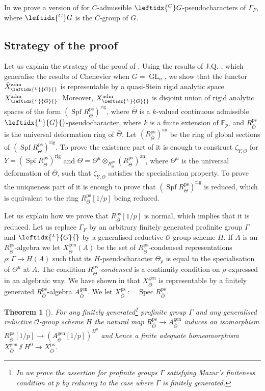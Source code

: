 \documentclass{amsart}
\newtheorem{thm}[prop]{Theorem}
\theoremstyle{definition}
\theoremstyle{remark}
\DeclareMathOperator{\GL}{GL}
\DeclareMathOperator{\Spec}{Spec}
\newcommand{\Fp}{\mathbb F_p}
\newcommand{\OO}{\mathcal O}
\newcommand{\ana}{\mathrm{an}}
\newcommand{\adm}{\mathrm{adm}}
\newcommand{\gen}{\mathrm{gen}}
\DeclareMathOperator{\Spf}{Spf}
\newcommand{\rig}{\mathrm{rig}}
\newcommand{\Thetabar}{\overline{\Theta}}
\newcommand{\ps}{\mathrm{ps}}
\newcommand{\LG}{\leftidx{^L}{G}{}}
\newcommand{\CG}{\leftidx{^C}G{}}
\begin{document}
In  we prove a version of  for $C$-admissible $\CG$-pseudo\-characters of $\Gamma_F$, where
$\CG$ is the $C$-group of $G$. 


\subsection{Strategy of the proof}
Let us explain the strategy of the proof of . Using the results of J.Q. \cite{quast}, which generalise the results of 
Chenevier \cite{che_durham} when $G=\GL_n$, we show that the functor $\tilde{X}^{\adm}_{\LG}$ is representable by 
a quasi-Stein rigid analytic space $X^{\adm}_{\LG}$. 
Moreover, $X^{\adm}_{\LG}$ is 
disjoint union of rigid analytic spaces of 
the form $(\Spf R^{\ps}_{\Thetabar})^{\rig}$, 
where $\Thetabar$ is a $k$-valued continuous 
admissible $\LG$-pseudocharacter, where $k$ is a 
finite extension of $\Fp$, and $R^{\ps}_{\Thetabar}$
is the universal deformation ring of $\Thetabar$. 
Let $(R^{\ps}_{\Thetabar})^{\ana}$ be the ring of 
global sections of $(\Spf R^{\ps}_{\Thetabar})^{\rig}$. To prove the existence part of  it is enough to construct $\zeta_{Y, \Theta}$ for $Y= (\Spf R^{\ps}_{\Thetabar})^{\rig}$ and $\Theta=\Theta^{u}\otimes _{R^{\ps}_{\Thetabar}} (R^{\ps}_{\Thetabar})^{\ana}$, where $\Theta^{u}$  is the universal deformation
of $\Thetabar$, such that $\zeta_{Y, \Theta}$ satisfies the specialisation property. To prove the uniqueness part of  it is 
enough to prove that $(\Spf R^{\ps}_{\Thetabar})^{\rig}$ is reduced, which is equivalent to the ring $R^{\ps}_{\Thetabar}[1/p]$ being reduced. 

Let us explain how we prove that $R^{\ps}_{\Thetabar}[1/p]$ is normal, which implies that it is reduced.  Let us replace 
$\Gamma_F$ by an arbitrary finitely generated profinite group $\Gamma$ and $\LG$ by a generalised reductive $\OO$-group scheme $H$. If $A$ is an $R^{\ps}_{\Thetabar}$-algebra we let $X^{\gen}_{\Thetabar}(A)$ be the 
set of $R^{\ps}_{\Thetabar}$-condensed representations $\rho: \Gamma \rightarrow H(A)$ such that its $H$-pseudocharacter $\Theta_{\rho}$ is equal to the specialisation of $\Theta^u$ at $A$. 
The condition \textit{$R^{\ps}_{\Thetabar}$-condensed} is a  continuity condition on $\rho$ expressed in an algebraic way. We have shown in \cite{defG} 
that $X^{\gen}_{\Thetabar}$ is representable by a finitely generated 
$R^{\ps}_{\Thetabar}$-algebra $A^{\gen}_{\Thetabar}$. We let $X^{\ps}_{\Thetabar}:=\Spec R^{\ps}_{\Thetabar}$.
\begin{thm}[]\label{intro_adequate} For any finitely generated\footnote{In \cite{MRL} we prove the assertion for profinite groups $\Gamma$ satisfying Mazur's finiteness condition at $p$ by reducing to the case where $\Gamma$ is finitely generated.} 
profinite group $\Gamma$ and any generalised reductive 
$\OO$-group scheme $H$ the natural map $R^{\ps}_{\Thetabar}\rightarrow A^{\gen}_{\Thetabar}$ induces an isomorphism $R^{\ps}_{\Thetabar}[1/p]\rightarrow (A^{\gen}_{\Thetabar}[1/p])^{H^0}$ and hence a finite adequate homeomorphism 
$X^{\gen}_{\Thetabar} \sslash H^0 \rightarrow X^{\ps}_{\Thetabar}$. 
\end{thm}
\end{document}
